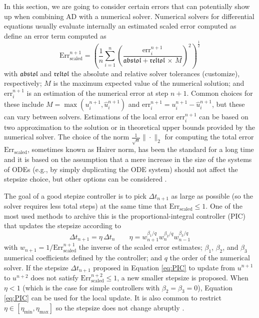 \label{appendix:dual-number-solver}

In this section, we are going to consider certain errors that can potentially show up when combining AD with a numerical solver. 
Numerical solvers for differential equations usually evaluate internally an estimated scaled error computed as 
define an error term computed as \cite{hairer-solving-1, Rackauckas_Nie_2016}
\begin{equation}
    \text{Err}_\text{scaled}^{n+1}
    =
    \left( \frac{1}{n} \sum_{i=1}^n \left( \frac{\text{err}_i^{n+1}}{\mathfrak{abstol} + \mathfrak{reltol} \, \times \, M} \right)^2 \right)^{\frac{1}{2}}
    \label{eq:internal-norm-wrong}
\end{equation}
with $\mathfrak{abstol}$ and $\mathfrak{reltol}$ the absolute and relative solver tolerances (customize), respectively; $M$ is the maximum expected value of the numerical solution; and $\text{err}_i^{n+1}$ is an estimation of the numerical error at step $n+1$. 
Common choices for these include $M = \max (u_i^{n+1}, \hat u_i^{n+1})$ and $\text{err}_i^{n+1} = u_i^{n+1} - \hat u_i^{n+1}$, but these can vary between solvers. 
Estimations of the local error $\text{err}_i^{n+1}$ can be based on two approximation to the solution or in theoretical upper bounds provided by the numerical solver. 
The choice of the norm $\frac{1}{\sqrt n} \| \cdot \|_2$ for computing the total error $\text{Err}_\text{scaled}$, sometimes known as Hairer norm, has been the standard for a long time\cite{Ranocha_Dalcin_Parsani_Ketcheson_2022} and it is based on the assumption that a mere increase in the size of the systems of ODEs (e.g., by simply duplicating the ODE system) should not affect the stepsize choice, but other options can be considered \cite{hairer-solving-1}.   

The goal of a good stepize controller is to pick $\Delta t_{n+1}$ as large as possible (so the solver requires less total steps) at the same time that $\text{Err}_\text{scaled} \leq 1$. 
One of the most used methods to archive this is the proportional-integral controller (PIC) that updates the stepsize according to \cite{hairer-solving-2, Ranocha_Dalcin_Parsani_Ketcheson_2022}
\begin{equation}
    \Delta t_{n+1} = \eta \, \Delta t_n
    \qquad 
    \eta = w_{n+1}^{\beta_1 / q} w_n^{\beta_2 / q} w_{n-1}^{\beta_3 / q}
    \label{eq:PIC}
\end{equation}
with $w_{n+1} = 1 / \text{Err}_\text{scaled}^{n+1}$ the inverse of the scaled error estimates; $\beta_1$, $\beta_2$, and $\beta_3$ numerical coefficients defined by the controller; and $q$ the order of the numerical solver. 
If the stepsize $\Delta t_{n+1}$ proposed in Equation \eqref{eq:PIC} to update from $u^{n+1}$ to $u^{n+2}$ does not satisfy $\text{Err}_\text{scaled}^{n+2} \leq 1$, a new smaller stepsize is proposed. 
When $\eta < 1$ (which is the case for simple controllers with $\beta_2 = \beta_3 = 0$), Equation \eqref{eq:PIC} can be used for the local update. 
It is also common to restrict $\eta \in [\eta_\text{min}, \eta_\text{max}]$ so the stepsize does not change abruptly \cite{hairer-solving-1}. 

